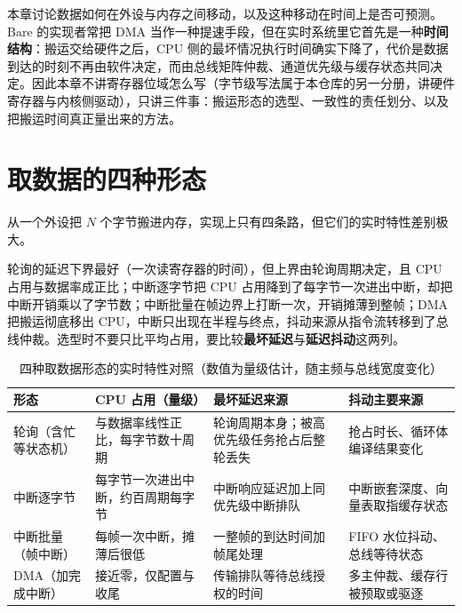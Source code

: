 \documentclass[12pt,a4paper,fontset=fandol]{ctexbook}
\newcommand{\Lang}[1]{\textsf{#1}}
\newcommand{\DomBare}{\Lang{Bare}}
\begin{document}
\label{ch:ch05-dma-datapath}

本章讨论数据如何在外设与内存之间移动，以及这种移动在时间上是否可预测。\DomBare{} 的实现者常把 DMA 当作一种提速手段，但在实时系统里它首先是一种\textbf{时间结构}：搬运交给硬件之后，CPU 侧的最坏情况执行时间确实下降了，代价是数据到达的时刻不再由软件决定，而由总线矩阵仲裁、通道优先级与缓存状态共同决定。因此本章不讲寄存器位域怎么写（字节级写法属于本仓库的另一分册，讲硬件寄存器与内核侧驱动），只讲三件事：搬运形态的选型、一致性的责任划分、以及把搬运时间真正量出来的方法。

\section{取数据的四种形态}

从一个外设把 $N$ 个字节搬进内存，实现上只有四条路，但它们的实时特性差别极大。

\begin{compare}[title={轮询、中断逐字节、中断批量与 DMA 的实时特性差异}]
轮询的延迟下界最好（一次读寄存器的时间），但上界由轮询周期决定，且 CPU 占用与数据率成正比；中断逐字节把 CPU 占用降到了每字节一次进出中断，却把中断开销乘以了字节数；中断批量在帧边界上打断一次，开销摊薄到整帧；DMA 把搬运彻底移出 CPU，中断只出现在半程与终点，抖动来源从指令流转移到了总线仲裁。选型时不要只比平均占用，要比较\textbf{最坏延迟}与\textbf{延迟抖动}这两列。
\end{compare}

\begin{table}[htbp]
\centering
\caption{四种取数据形态的实时特性对照（数值为量级估计，随主频与总线宽度变化）}
\label{tab:ch05-acquire-modes}
\begin{tabular}{>{\raggedright\arraybackslash}p{} >{\raggedright\arraybackslash}p{} >{\raggedright\arraybackslash}p{} >{\raggedright\arraybackslash}p{}}
\toprule
形态 & CPU 占用（量级） & 最坏延迟来源 & 抖动主要来源 \\
\midrule
轮询（含忙等状态机） & 与数据率线性正比，每字节数十周期 & 轮询周期本身；被高优先级任务抢占后整轮丢失 & 抢占时长、循环体编译结果变化 \\
中断逐字节 & 每字节一次进出中断，约百周期每字节 & 中断响应延迟加上同优先级中断排队 & 中断嵌套深度、向量表取指缓存状态 \\
中断批量（帧中断） & 每帧一次中断，摊薄后很低 & 一整帧的到达时间加帧尾处理 & FIFO 水位抖动、总线等待状态 \\
DMA（加完成中断） & 接近零，仅配置与收尾 & 传输排队等待总线授权的时间 & 多主仲裁、缓存行被预取或驱逐 \\
\bottomrule
\end{tabular}
\end{table}
\end{document}

